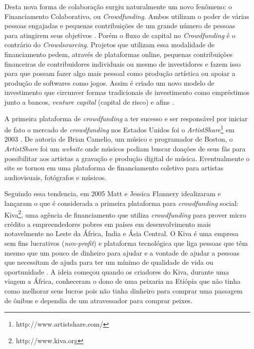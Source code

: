 Desta nova forma de colaboração surgiu naturalmente um novo fenômeno: o Financiamento Colaborativo, ou \emph{Crowdfunding}. Ambos utilizam o poder de várias pessoas engajadas e pequenas contribuições de um grande número de pessoas para atingirem seus objetivos \cite{crowdfunding-culture}. Porém o fluxo de capital no \emph{Crowdfunding} é o contrário do \emph{Crowdsourcing}. Projetos que utilizam essa modalidade de financiamento pedem, através de plataformas online, pequenas contribuições financeiras de contribuidores individuais ou mesmo de investidores e fazem isso para que possam fazer algo mais pessoal como produção artística ou apoiar a produção de softwares como jogos. Assim é criado um novo modelo de investimento que circunver formas tradicionais de investimento como empréstimos junto a bancos, \emph{venture capital} (capital de risco) e afins \cite{belleflamme2010}.

A primeira plataforma de \emph{crowdfunding} a ter sucesso e ser responsável por iniciar de fato o mercado de \emph{crowdfunding} nos Estados Unidos foi o \emph{ArtistShare}\footnote{http://www.artistshare.com/} em 2003 \cite{freedman2015brief}. De autoria de Brian Camelio, um músico e programador de Boston, o \emph{ArtistShare} foi um \emph{website} onde músicos podiam buscar doações de seus fãs para possibilitar aos artistas a gravação e produção digital de música. Eventualmente o site se tornou em uma plataforma de financiamento coletivo para artistas audiovisuais, fotógrafos e músicos.

Seguindo essa tendencia, em 2005 Matt e Jessica Flannery idealizaram e lançaram o que é considerada a primeira plataforma para \emph{crowdfunding} social: Kiva\footnote{http://www.kiva.org}, uma agência de financiamento que utiliza \emph{crowdfunding} para prover micro crédito a empreendedores pobres em países em desenvolvimento mais notavelmente no Leste da África, India e Ásia Central. O Kiva é uma empresa sem fins lucrativos (\emph{non-profit}) e plataforma tecnológica que liga pessoas que têm mesmo que um pouco de dinheiro para ajudar e a vontade de ajudar a pessoas que necessitam de ajuda para ter um mínimo de qualidade de vida ou oportunidade \cite{flannery2007kiva}. A ideia começou quando os criadores do Kiva, durante uma viagem a África, conheceram o dono de uma peixaria na Etiópia que não tinha como melhorar seus lucros pois não tinha dinheiro para comprar uma passagem de ônibus e dependia de um atravessador para comprar peixes.

